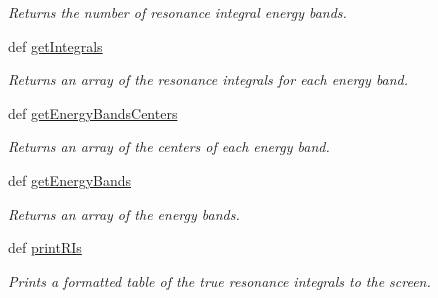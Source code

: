 \begin{DoxyCompactItemize}
\begin{DoxyCompactList}\small\item\em Returns the number of resonance integral energy bands. \end{DoxyCompactList}\item 
def \hyperlink{classpinspec_1_1process_1_1RITrue_a5aa42d3c5b4d313f8dee9e56ffe42dd3}{get\-Integrals}
\begin{DoxyCompactList}\small\item\em Returns an array of the resonance integrals for each energy band. \end{DoxyCompactList}\item 
def \hyperlink{classpinspec_1_1process_1_1RITrue_a0fc3d14d394d10c5ec93fd2933d4e82e}{get\-Energy\-Bands\-Centers}
\begin{DoxyCompactList}\small\item\em Returns an array of the centers of each energy band. \end{DoxyCompactList}\item 
def \hyperlink{classpinspec_1_1process_1_1RITrue_a338c2ef0063836581497f4ab957d3a77}{get\-Energy\-Bands}
\begin{DoxyCompactList}\small\item\em Returns an array of the energy bands. \end{DoxyCompactList}\item 
def \hyperlink{classpinspec_1_1process_1_1RITrue_a306c5e00b9d9999020e6b27f4ff7e89d}{print\-R\-Is}
\begin{DoxyCompactList}\small\item\em Prints a formatted table of the true resonance integrals to the screen. \end{DoxyCompactList}\end{DoxyCompactItemize}

